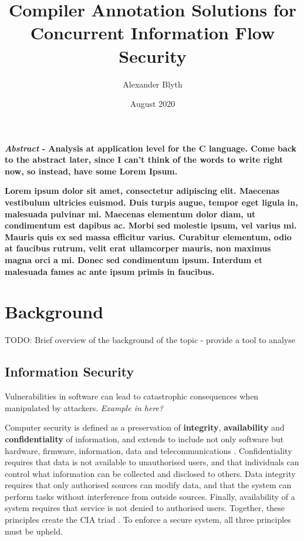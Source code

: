 \documentclass[twocolumn]{article}
\title{Compiler Annotation Solutions for Concurrent Information Flow Security}
\author{Alexander Blyth}
\date{August 2020}
\begin{document}
\maketitle



\textbf{\textit{Abstract} - Analysis at application level for the C language. Come back to the abstract later, since I can't think of the words to write right now, so instead, have some Lorem Ipsum.}

\textbf{Lorem ipsum dolor sit amet, consectetur adipiscing elit. Maecenas vestibulum ultricies euismod. Duis turpis augue, tempor eget ligula in, malesuada pulvinar mi. Maecenas elementum dolor diam, ut condimentum est dapibus ac. Morbi sed molestie ipsum, vel varius mi. Mauris quis ex sed massa efficitur varius. Curabitur elementum, odio at faucibus rutrum, velit erat ullamcorper mauris, non maximus magna orci a mi. Donec sed condimentum ipsum. Interdum et malesuada fames ac ante ipsum primis in faucibus.}

\section{Background}
TODO: Brief overview of the background of the topic
- provide a tool to analyse 
\subsection{Information Security}
Vulnerabilities in software can lead to catastrophic consequences when manipulated by attackers. \textit{Example in here?}

Computer security is defined as a preservation of \textbf{integrity}, \textbf{availability} and \textbf{confidentiality} of information, and extends to include not only software but hardware, firmware, information, data and telecommunications \cite{guttman1995introduction}.
Confidentiality requires that data is not available to unauthorised users, and that individuals can control what information can be collected and disclosed to others. Data integrity requires that only authorised sources can modify data, and that the system can perform tasks without interference from outside sources. Finally, availability of a system requires that service is not denied to authorised users. Together, these principles create the CIA triad \cite{stallings2012computer}. To enforce a secure system, all three principles must be upheld.
\end{document}
